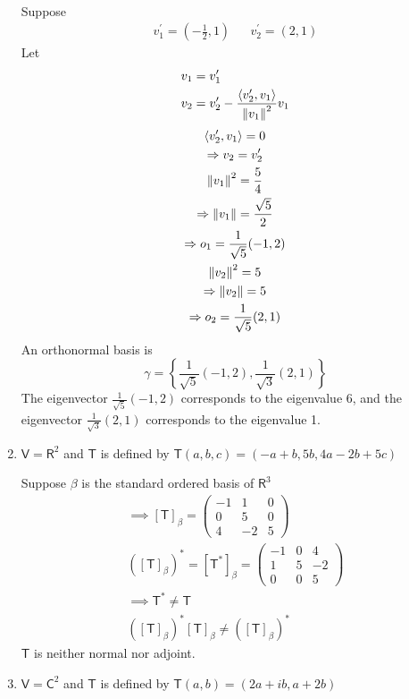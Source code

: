 \begin{enumerate}
\begin{itemize}
\begin{gather}
\end{gather}
\end{itemize}
Suppose
\begin{align}
v_1^\prime = (-\frac{1}{2},1) & & v_2^\prime = (2,1)
\end{align}
Let
\begin{align}
v_1 &= v_1^\prime\\
v_2 &= v_2^\prime - \frac{\langle v_2^\prime, v_1\rangle}{\left\lVert v_1\right\rVert^2}v_1
\end{align}
\begin{gather}
\langle v_2^\prime,v_1\rangle = 0\\
\Rightarrow v_2 = v_2^\prime\\
\left\lVert v_1\right\rVert^2 = \frac{5}{4}\\
\Rightarrow \left\lVert v_1\right\rVert = \frac{\sqrt{5}}{2}\\
\Rightarrow o_1 = \frac{1}{\sqrt{5}}(-1,2)\\
\left\lVert v_2\right\rVert^2 = 5 \\
\Rightarrow \left\lVert v_2\right\rVert =5\\
\Rightarrow o_2 = \frac{1}{\sqrt{5}}(2,1)
\end{gather}
An orthonormal basis is
\begin{equation}
\gamma = \left\{\frac{1}{\sqrt{5}}(-1,2),\frac{1}{\sqrt{3}}(2,1)\right\}
\end{equation}
The eigenvector $\frac{1}{\sqrt{5}}(-1,2)$ corresponds to the
eigenvalue 6, and the eigenvector $\frac{1}{\sqrt{3}}(2,1)$
corresponds to the eigenvalue 1.

\item $\mathsf{V} = \mathsf{R}^2$ and $\mathsf{T}$ is defined by
  $\mathsf{T}(a,b,c) = (-a+b,5b,4a-2b+5c)$

Suppose $\beta$ is the standard ordered basis of $\mathsf{R}^3$
\begin{gather}
\implies [\mathsf{T}]_\beta = \begin{pmatrix}
-1 & 1 & 0\\
0 & 5 & 0\\
4 & -2 & 5
\end{pmatrix}\\
([\mathsf{T}]_\beta)^* = [\mathsf{T}^*]_\beta = \begin{pmatrix}
-1 & 0 & 4\\
1 & 5 & -2\\
0 & 0 & 5
\end{pmatrix}\\
\implies \mathsf{T}^* \neq \mathsf{T}\\
([\mathsf{T}]_\beta)^*[\mathsf{T}]_\beta \neq ([\mathsf{T}]_\beta)^*
\end{gather}
$\mathsf{T}$ is neither normal nor adjoint.
\item $\mathsf{V}= \mathsf{C}^2$ and $\mathsf{T}$ is defined by
  $\mathsf{T}(a,b) = (2a+ib,a+2b)$


\end{enumerate}
